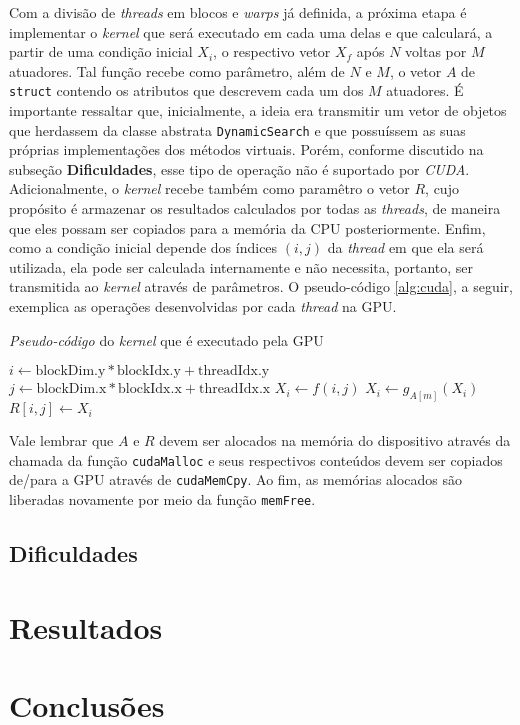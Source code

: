 \documentclass[12pt]{article}
\begin{document}
Com a divisão de \textit{threads} em blocos e \textit{warps} já definida, a
próxima etapa é implementar o \textit{kernel} que será executado em cada uma
delas e que calculará, a partir de uma condição inicial \(X_i\), o respectivo
vetor \(X_f\) após \(N\) voltas por \(M\)
atuadores. Tal função recebe como parâmetro, além de \(N\) e \(M\), o vetor
\(A\) de \texttt{struct} contendo os atributos que descrevem cada um dos \(M\)
atuadores. É importante ressaltar que, inicialmente, a ideia era transmitir um
vetor de objetos que herdassem da classe abstrata \texttt{DynamicSearch} e que
possuíssem as suas próprias implementações dos métodos virtuais. Porém, conforme
discutido na subseção \textbf{Dificuldades}, esse tipo de operação não é
suportado por \textit{CUDA}. Adicionalmente, o \textit{kernel} recebe também
como paramêtro o vetor $R$, cujo propósito é armazenar os resultados calculados
por todas as \textit{threads}, de maneira que eles possam ser copiados para a
memória da CPU posteriormente. Enfim, como a condição inicial depende dos
índices \((i,j)\) da \textit{thread} em que ela será utilizada, ela pode ser
calculada internamente e não necessita, portanto, ser transmitida ao
\textit{kernel} através de parâmetros. O pseudo-código \ref{alg:cuda}, a seguir,
exemplica as operações desenvolvidas por cada \textit{thread} na GPU.

\begin{algorithm}
\caption{\label{alg:cuda} \textit{Pseudo-código} do \textit{kernel} que é
executado pela GPU} \begin{algorithmic}[1]
  	\State ${i} \gets \text{blockDim.y} * \text{blockIdx.y} + \text{threadIdx.y} $  
  	\State ${j} \gets \text{blockDim.x} * \text{blockIdx.x} + \text{threadIdx.x} $   
    \State ${X_i} \gets f(i,j) $ 
     
         
        	\State $X_i \gets g_{A[m]} (X_i)$ 
    	\EndFor
    \EndFor
    \State ${R[i,j]} \gets X_i $ 
   \EndFunction

\end{algorithmic}
\end{algorithm}

Vale lembrar que \(A\) e \(R\) devem ser alocados na memória do dispositivo
através da chamada da função \texttt{cudaMalloc} e seus respectivos conteúdos
devem ser copiados de/para a GPU através de \texttt{cudaMemCpy}. Ao fim, as
memórias alocados são liberadas novamente por meio da função \texttt{memFree}.

\subsection{Dificuldades}

\section{Resultados}



\section{Conclusões}



\end{document}
